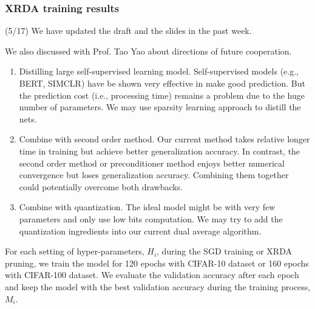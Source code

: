 %


\subsubsection{XRDA training results}
(5/17) 
We have updated the draft and the slides in the past week. 

We also discussed with Prof. Tao Yao about directions of future cooperation. 

\begin{enumerate}
\item Distilling large self-supervised learning model. Self-supervised models (e.g., BERT, SIMCLR) have be shown very effective in make good prediction. But the prediction cost (i.e., processing time) remains a problem due to the huge number of parameters. We may use sparsity learning approach to distill the nets.
\item  Combine with second order method. Our current method takes relative longer time in training but achieve better generalization accuracy. In contrast, the second order method or preconditioner method enjoys better numerical convergence but loses generalization accuracy. Combining them together could potentially overcome both drawbacks.
\item  Combine with quantization. The ideal model might be with very few parameters and only use low bits computation. We may try to add the quantization ingredients into our current dual average algorithm.
\end{enumerate}


For each setting of hyper-parameters, $H_i$, during the SGD training or XRDA pruning, we train the model for 120 epochs with CIFAR-10 dataset or 160 epochs with CIFAR-100  dataset. We evaluate the validation accuracy after each epoch and keep the model with the best validation accuracy during the training process, $M_i$. 


